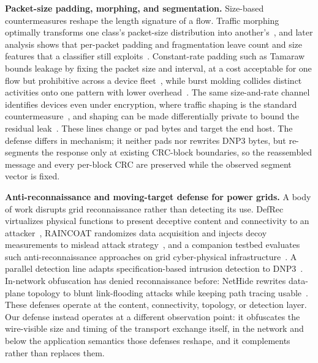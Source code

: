 \noindent\textbf{Packet-size padding, morphing, and segmentation.} Size-based countermeasures reshape
the length signature of a flow. Traffic morphing optimally transforms one class's packet-size
distribution into another's~\cite{wright2009}, and later analysis shows that per-packet padding and
fragmentation leave count and size features that a classifier still exploits~\cite{dyer2012}.
Constant-rate padding such as Tamaraw bounds leakage by fixing the packet size and interval, at a cost
acceptable for one flow but prohibitive across a device fleet~\cite{tamaraw2014}, while burst molding
collides distinct activities onto one pattern with lower overhead~\cite{walkietalkie2017}. The same
size-and-rate channel identifies devices even under encryption, where traffic shaping is the standard
countermeasure~\cite{apthorpe2019}, and shaping can be made differentially private to bound the
residual leak~\cite{netshaper2024}. These lines change or pad bytes and target the end host. The defense differs in mechanism; it neither pads nor
rewrites DNP3 bytes, but re-segments the response only at existing CRC-block boundaries, so the
reassembled message and every per-block CRC are preserved while the observed segment vector is fixed.

\noindent\textbf{Anti-reconnaissance and moving-target defense for power grids.} A body of work
disrupts grid reconnaissance rather than detecting its use. DefRec virtualizes physical functions to
present deceptive content and connectivity to an attacker~\cite{defrec2020}, RAINCOAT randomizes data
acquisition and injects decoy measurements to mislead attack strategy~\cite{raincoat2019}, and a
companion testbed evaluates such anti-reconnaissance approaches on grid cyber-physical
infrastructure~\cite{lintestbed2020}. A parallel detection line adapts specification-based intrusion
detection to DNP3~\cite{linbro2013}. In-network obfuscation has denied reconnaissance before: NetHide
rewrites data-plane topology to blunt link-flooding attacks while keeping path tracing
usable~\cite{nethide2018}. These defenses operate at the content, connectivity, topology, or detection
layer. Our defense instead operates at a different observation point: it obfuscates the wire-visible size and timing of the
transport exchange itself, in the network and below the application semantics those defenses reshape,
and it complements rather than replaces them.

